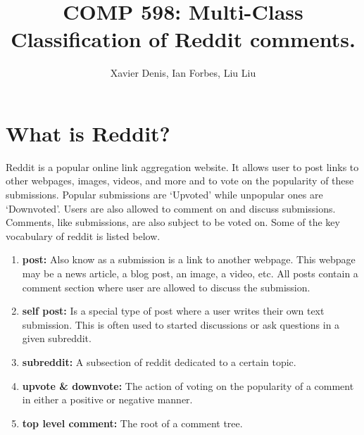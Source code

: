 \documentclass[10pt,twocolumn]{article}
\title {COMP 598: Multi-Class Classification of Reddit comments.}
\author {Xavier Denis, Ian Forbes, Liu Liu}
\begin{document}
\section{What is Reddit?}

Reddit is a popular online link aggregation website. It allows user to post links to other webpages, images, videos, and more and to vote on the popularity of these submissions. Popular submissions are `Upvoted' while unpopular ones are `Downvoted'. Users are also allowed to comment on and discuss submissions. Comments, like submissions, are also subject to be voted on. Some of the key vocabulary of reddit is listed below.

\begin {enumerate}
\item \textbf{post:} Also know as a submission is a link to another webpage. This webpage may be a news article, a blog post, an image, a video, etc. All posts contain a comment section where user are allowed to discuss the submission.
\item \textbf{self post:} Is a special type of post where a user writes their own text submission. This is often used to started discussions or ask questions in a given subreddit. 
\item \textbf{subreddit:} A subsection of reddit dedicated to a certain topic. 
\item \textbf{upvote \& downvote:} The action of voting on the popularity of a comment in either a positive or negative manner.
\item \textbf{top level comment:} The root of a comment tree.
\end {enumerate}
\end{document}
